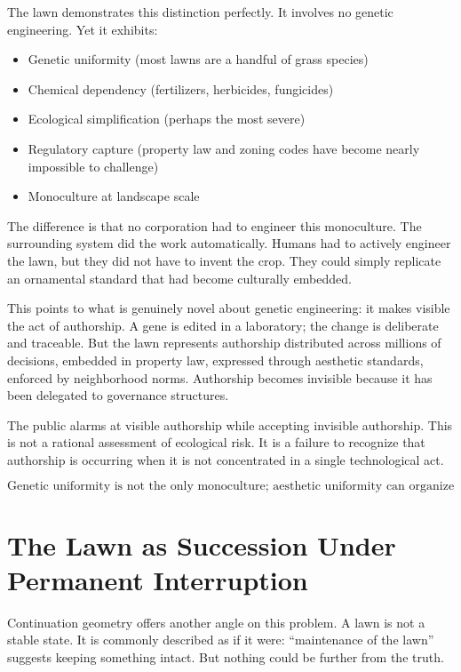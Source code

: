 \documentclass[12pt]{article}
\begin{document}
The lawn demonstrates this distinction perfectly. It involves no genetic engineering. Yet it exhibits:

\begin{itemize}
\item Genetic uniformity (most lawns are a handful of grass species)
\item Chemical dependency (fertilizers, herbicides, fungicides)
\item Ecological simplification (perhaps the most severe)
\item Regulatory capture (property law and zoning codes have become nearly impossible to challenge)
\item Monoculture at landscape scale
\end{itemize}

The difference is that no corporation had to engineer this monoculture. The surrounding system did the work automatically. Humans had to actively engineer the lawn, but they did not have to invent the crop. They could simply replicate an ornamental standard that had become culturally embedded.

This points to what is genuinely novel about genetic engineering: it makes visible the act of authorship. A gene is edited in a laboratory; the change is deliberate and traceable. But the lawn represents authorship distributed across millions of decisions, embedded in property law, expressed through aesthetic standards, enforced by neighborhood norms. Authorship becomes invisible because it has been delegated to governance structures.

The public alarms at visible authorship while accepting invisible authorship. This is not a rational assessment of ecological risk. It is a failure to recognize that authorship is occurring when it is not concentrated in a single technological act.

\begin{equation}
\boxed{\text{Genetic uniformity is not the only monoculture; aesthetic uniformity can organize monoculture at landscape scale.}}
\end{equation}

\section{The Lawn as Succession Under Permanent Interruption}

Continuation geometry offers another angle on this problem. A lawn is not a stable state. It is commonly described as if it were: ``maintenance of the lawn'' suggests keeping something intact. But nothing could be further from the truth.
\end{document}
